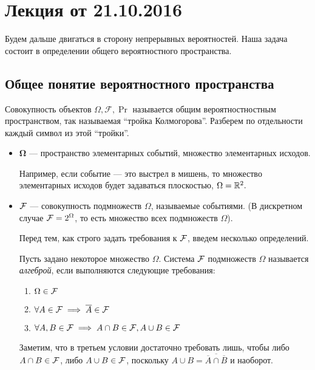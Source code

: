 \section{Лекция от 21.10.2016}

Будем дальше двигаться в сторону непрерывных вероятностей. Наша задача состоит в определении общего вероятностного пространства.

\subsection{Общее понятие вероятностного пространства}
Совокупность объектов \(\Omega, \mathcal{F}, \Pr \) называется общим вероятностностным пространством, так называемая ``тройка Колмогорова''.
Разберем по отдельности каждый символ из этой ``тройки''.
\begin{itemize}
	\item $\mathbf{\Omega}$ --- пространство элементарных событий, множество элементарных исходов.

	Например, если событие --- это выстрел в мишень, то множество элементарных исходов будет задаваться плоскостью, \(\Omega = \mathbb{R}^2. \)
	
	\item $\mathcal{F}$ --- совокупность подмножеств $\Omega$, называемые событиями. (В дискретном случае $\mathcal{F} = 2^{\Omega}$, то есть множество всех подмножеств $ \Omega $).

    Перед тем, как строго задать требования к $ \mathcal{F} $, введем несколько определений.

        \begin{definition}
            Пусть задано некоторое множество $ \Omega $. Система $ \mathcal{F} $ подмножеств $ \Omega $ называется \emph{алгеброй}, если выполняются следующие требования:


            \begin{enumerate}
                \item \( \Omega \in \mathcal{F} \)

                \item \( \forall A \in \mathcal{F} \implies \overline{A} \in \mathcal{F} \)

                \item \( \forall A, B \in \mathcal{F} \implies A \cap B \in \mathcal{F}, A \cup B \in \mathcal{F} \)
            \end{enumerate}
            Заметим, что в третьем условии достаточно требовать лишь, чтобы либо \(A \cap B \in \mathcal{F}\), либо \(A \cup B \in \mathcal{F}\), поскольку \(A \cup B = \overline {\overline{A} \cap \overline{B}}\) и наоборот.


\end{definition}
\end{itemize}
